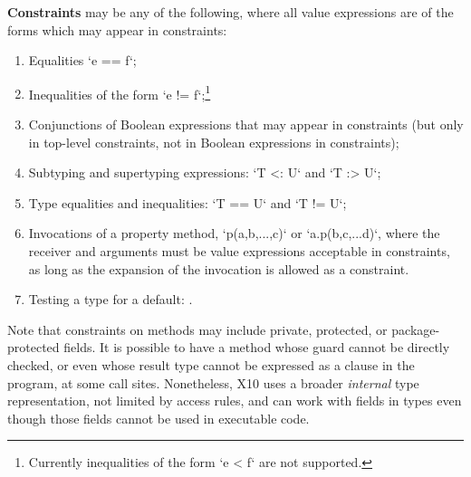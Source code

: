 {\bf Constraints}  may be any of
the following, where 
all value expressions are of the forms which may appear in constraints: 
\begin{enumerate}
\item Equalities \xcd`e == f`;
\item Inequalities of the form \xcd`e != f`;\footnote{Currently inequalities
      of the form \xcd`e < f` are not supported.}
\item Conjunctions of Boolean expressions that may appear in constraints (but
      only in top-level constraints, not in Boolean expressions in constraints);
\item Subtyping and supertyping expressions: \xcd`T <: U` and \xcd`T :> U`; 
\item Type equalities and inequalities: \xcd`T == U` and \xcd`T != U`; 
\item Invocations of a property method, \xcd`p(a,b,...,c)` or
      \xcd`a.p(b,c,...d)`, where the receiver and arguments must be value
      expressions acceptable in constraints, as long as the expansion of the
      invocation is allowed as a constraint.
\item Testing a type for a default: .
\end{enumerate}


Note that constraints on methods may include private, protected, or
package-protected  fields.  It is
possible to have a method whose guard cannot be directly checked, or even
whose result type cannot be expressed as a clause in the program, at some call
sites.  
Nonetheless, X10 uses a broader {\em internal} type representation, not
limited by access rules, and can work with fields in types even though those
fields cannot be used in executable code. 


